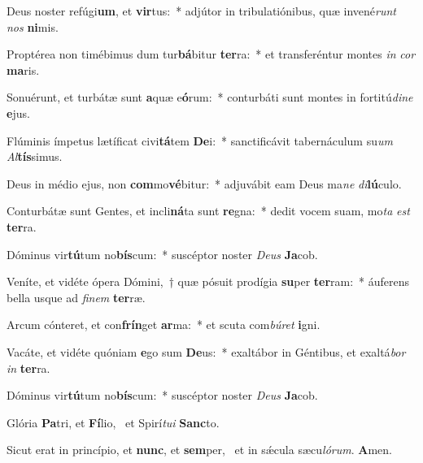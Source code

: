 \item Deus noster refúgi\textbf{um}, et \textbf{vir}tus:~* adjútor in tribulatiónibus, quæ invené\textit{runt} \textit{nos} \textbf{ni}mis.
\item Proptérea non timébimus dum tur\textbf{bá}bitur \textbf{ter}ra:~* et transferéntur montes \textit{in} \textit{cor} \textbf{ma}ris.
\item Sonuérunt, et turbátæ sunt \textbf{a}quæ e\textbf{ó}rum:~* conturbáti sunt montes in fortitú\textit{di}\textit{ne} \textbf{e}jus.
\item Flúminis ímpetus lætíficat civi\textbf{tá}tem \textbf{De}i:~* sanctificávit tabernáculum su\textit{um} \textit{Al}\textbf{tís}simus.
\item Deus in médio ejus, non \textbf{com}mo\textbf{vé}bitur:~* adjuvábit eam Deus ma\textit{ne} \textit{di}\textbf{lú}culo.
\item Conturbátæ sunt Gentes, et incli\textbf{ná}ta sunt \textbf{re}gna:~* dedit vocem suam, mo\textit{ta} \textit{est} \textbf{ter}ra.
\item Dóminus vir\textbf{tú}tum no\textbf{bís}\-cum:~* suscéptor noster \textit{De}\textit{us} \textbf{Ja}cob.
\item Veníte, et vidéte ópera Dómini,~† quæ pósuit prodígia \textbf{su}per \textbf{ter}ram:~* áuferens bella usque ad \textit{fi}\textit{nem} \textbf{ter}ræ.
\item Arcum cónteret, et con\textbf{frín}get \textbf{ar}ma:~* et scuta com\textit{bú}\textit{ret} \textbf{i}gni.
\item Vacáte, et vidéte quóniam \textbf{e}go sum \textbf{De}us:~* exaltábor in Géntibus, et exaltá\textit{bor} \textit{in} \textbf{ter}ra.
\item Dóminus vir\textbf{tú}tum no\textbf{bís}\-cum:~* suscéptor noster \textit{De}\textit{us} \textbf{Ja}cob.
\item Glória \textbf{Pa}tri, et \textbf{Fí}lio,~\psstar{} et Spirí\textit{tu}\textit{i} \textbf{Sanc}to.
\item Sicut erat in princípio, et \textbf{nunc}, et \textbf{sem}per,~\psstar{} et in sǽcula sæcu\textit{ló}\textit{rum}. \textbf{A}men.